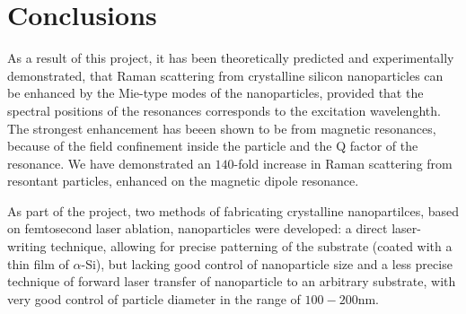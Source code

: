 \section{Conclusions}
    As a result of this project, it has been theoretically predicted and experimentally demonstrated, that Raman scattering
    from crystalline silicon nanoparticles can be enhanced by the Mie-type modes of the nanoparticles, provided that the
    spectral positions of the resonances corresponds to the excitation wavelenghth. The strongest enhancement has beeen shown
    to be from magnetic resonances, because of the field confinement inside the particle and the Q factor of the resonance.
    We have demonstrated an $140$-fold increase in Raman scattering from resontant particles, enhanced on the magnetic dipole
    resonance.

    As part of the project, two methods of fabricating crystalline nanopartilces, based on femtosecond laser ablation,
    nanoparticles were developed: a direct laser-writing technique, allowing for precise patterning of the substrate
    (coated with a thin film of $\alpha$-Si), but lacking good control of nanoparticle size and a less precise technique
    of forward laser transfer of nanoparticle to an arbitrary substrate, with very good control of particle diameter in the
    range of $100-200$nm.
\clearpage
